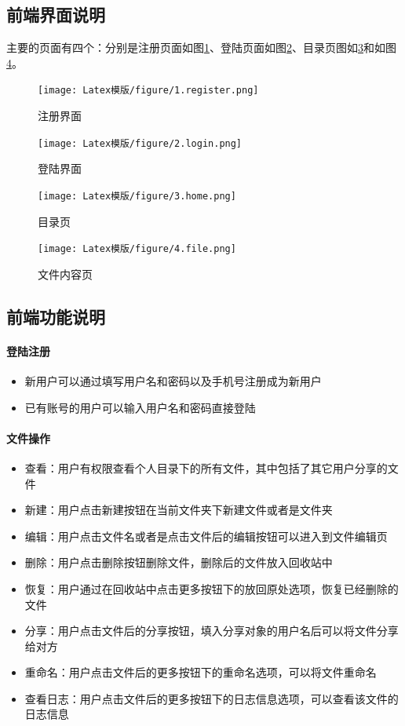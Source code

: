 \documentclass[UTF8]{ctexart}
\begin{document}
\subsection{前端界面说明}
\par{主要的页面有四个：分别是注册页面如图\ref{fig:注册}、登陆页面如图\ref{fig:登陆}、目录页图如\ref{fig:目录}和如图\ref{fig:文件内容}。}
\begin{figure}[h]
    \centering
    \texttt{[image: Latex模版/figure/1.register.png]}
	\caption{注册界面}
	\label{fig:注册}
\end{figure}
\begin{figure}[h]
    \centering
    \texttt{[image: Latex模版/figure/2.login.png]}
	\caption{登陆界面}
	\label{fig:登陆}
\end{figure}
\begin{figure}[h]
    \centering
    \texttt{[image: Latex模版/figure/3.home.png]}
	\caption{目录页}
	\label{fig:目录}
\end{figure}
\begin{figure}[h]
    \centering
    \texttt{[image: Latex模版/figure/4.file.png]}
	\caption{文件内容页}
	\label{fig:文件内容}
\end{figure}

\subsection{前端功能说明}
\paragraph{登陆注册}
\begin{itemize}
\item 新用户可以通过填写用户名和密码以及手机号注册成为新用户
\item 已有账号的用户可以输入用户名和密码直接登陆
\end{itemize}
\paragraph{文件操作}
\begin{itemize}
\item 查看：用户有权限查看个人目录下的所有文件，其中包括了其它用户分享的文件
\item 新建：用户点击新建按钮在当前文件夹下新建文件或者是文件夹
\item 编辑：用户点击文件名或者是点击文件后的编辑按钮可以进入到文件编辑页
\item 删除：用户点击删除按钮删除文件，删除后的文件放入回收站中
\item 恢复：用户通过在回收站中点击更多按钮下的放回原处选项，恢复已经删除的文件
\item 分享：用户点击文件后的分享按钮，填入分享对象的用户名后可以将文件分享给对方
\item 重命名：用户点击文件后的更多按钮下的重命名选项，可以将文件重命名
\item 查看日志：用户点击文件后的更多按钮下的日志信息选项，可以查看该文件的日志信息
\end{itemize}
\end{document}
